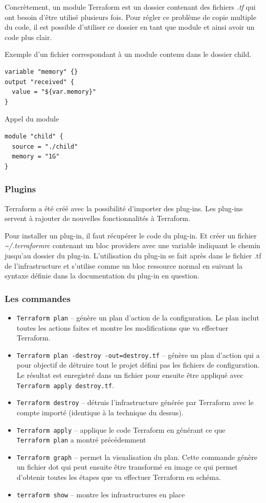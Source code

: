 \documentclass[]{article}
\providecommand{\tightlist}{%
  \setlength{\itemsep}{0pt}\setlength{\parskip}{0pt}}
\begin{document}
Concrètement, un module Terraform est un dossier contenant
des fichiers \emph{.tf} qui ont besoin d'être utilisé plusieurs fois.
Pour régler ce problème de copie multiple du code, il est possible
d'utiliser ce dossier en tant que module et ainsi avoir un code plus
clair.

Exemple d'un fichier correspondant à un module contenu dans le dossier child.
\begin{verbatim}
variable "memory" {}
output "received" {
  value = "${var.memory}"
}
\end{verbatim}
Appel du module
\begin{verbatim}
module "child" {
  source = "./child"
  memory = "1G"
}
\end{verbatim}

\subsubsection{Plugins}\label{plugins}
Terraform a été créé avec la possibilité d'importer des plug-ins.
Les plug-ins servent à rajouter de nouvelles fonctionnalités à Terraform.

Pour installer un plug-in, il faut récupérer le code du plug-in. Et créer un
fichier \emph{\textasciitilde{}/.terraformrc} contenant un bloc
providers avec une variable indiquant le chemin jusqu'au dossier du
plug-in. L'utilisation du plug-in se fait après dans le fichier .tf de
l’infrastructure et s'utilise comme un bloc ressource normal en suivant
la syntaxe définie dans la documentation du plug-in en question.

\subsubsection{Les commandes}\label{les-commandes}
\begin{itemize}
\tightlist
\item
  \texttt{Terraform\ plan} -- génère un plan d'action de la
  configuration. Le plan inclut toutes les actions faites et montre les
  modifications que va effectuer Terraform.
\item
  \texttt{Terraform\ plan\ -destroy\ -out=destroy.tf} -- génère un plan
  d'action qui a pour objectif de détruire tout le projet défini pas les
  fichiers de configuration. Le résultat est enregistré dans un fichier
  pour ensuite être appliqué avec \texttt{Terraform\ apply\ destroy.tf}.
\item
  \texttt{Terraform\ destroy} -- détruis l'infrastructure générée par
  Terraform avec le compte importé (identique à la technique du dessus).
\item
  \texttt{Terraform\ apply} -- applique le code Terraform en générant ce
  que \texttt{Terraform\ plan} a montré précédemment
\item
  \texttt{Terraform\ graph} -- permet la visualisation du plan. Cette
  commande génère un fichier dot qui peut ensuite être transformé en
  image ce qui permet d'obtenir toutes les étapes que va
  effectuer Terraform en schéma.
\item
  \texttt{terraform\ show} -- montre les infrastructures en place
\end{itemize}
\end{document}
